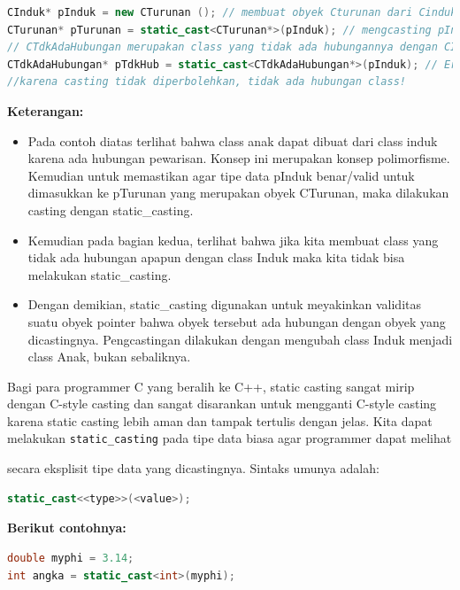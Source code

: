 \begin{lstlisting}[language=c++, numbers=none]
CInduk* pInduk = new CTurunan (); // membuat obyek Cturunan dari Cinduk (polymorfisme)
CTurunan* pTurunan = static_cast<CTurunan*>(pInduk); // mengcasting pInduk menjadi Cturunan, valid!
// CTdkAdaHubungan merupakan class yang tidak ada hubungannya dengan CInduk melalui inheritance
CTdkAdaHubungan* pTdkHub = static_cast<CTdkAdaHubungan*>(pInduk); // Error
//karena casting tidak diperbolehkan, tidak ada hubungan class!
\end{lstlisting}

\textbf{Keterangan:}

\begin{itemize}

\item
  Pada contoh diatas terlihat bahwa class anak dapat dibuat dari class
  induk karena ada hubungan pewarisan. Konsep ini merupakan konsep
  polimorfisme. Kemudian untuk memastikan agar tipe data pInduk
  benar/valid untuk dimasukkan ke pTurunan yang merupakan obyek
  CTurunan, maka dilakukan casting dengan static\_casting.
\item
  Kemudian pada bagian kedua, terlihat bahwa jika kita membuat class
  yang tidak ada hubungan apapun dengan class Induk maka kita tidak bisa
  melakukan static\_casting.
\item
  Dengan demikian, static\_casting digunakan untuk meyakinkan validitas
  suatu obyek pointer bahwa obyek tersebut ada hubungan dengan obyek
  yang dicastingnya. Pengcastingan dilakukan dengan mengubah class Induk
  menjadi class Anak, bukan sebaliknya.
\end{itemize}

Bagi para programmer C yang beralih ke C++, static casting sangat mirip
dengan C-style casting dan sangat disarankan untuk mengganti C-style
casting karena static casting lebih aman dan tampak tertulis dengan
jelas. Kita dapat melakukan \texttt{static\_casting} pada tipe data
biasa agar programmer dapat melihat

secara eksplisit tipe data yang dicastingnya. Sintaks umunya adalah:

\begin{lstlisting}[language=c++, numbers=none]
static_cast<<type>>(<value>);
\end{lstlisting}

\textbf{Berikut contohnya:}

\begin{lstlisting}[language=c++, numbers=none]
double myphi = 3.14;
int angka = static_cast<int>(myphi);
\end{lstlisting}

